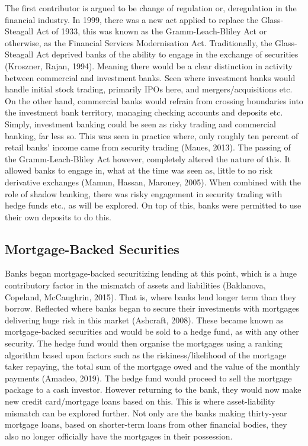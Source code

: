 \documentclass[11pt, english]{article}
\begin{document}
	The first contributor is argued to be change of regulation or, deregulation in the financial industry. In 1999, there was a new act applied to replace the Glass-Steagall Act of 1933, this was known as the Gramm-Leach-Bliley Act or otherwise, as the Financial Services Modernisation Act. Traditionally, the Glass-Steagall Act deprived banks of the ability to engage in the exchange of securities (Kroszner, Rajan, 1994). Meaning there would be a clear distinction in activity between commercial and investment banks. Seen where investment banks would handle initial stock trading, primarily IPOs here, and mergers/acquisitions etc. On the other hand, commercial banks would refrain from crossing boundaries into the investment bank territory, managing checking accounts and deposits etc. Simply, investment banking could be seen as risky trading and commercial banking, far less so. This was seen in practice where, only roughly ten percent of retail banks' income came from security trading (Maues, 2013). The passing of the Gramm-Leach-Bliley Act however, completely altered the nature of this. It allowed banks to engage in, what at the time was seen as, little to no risk derivative exchanges (Mamun, Hassan, Maroney, 2005). When combined with the role of shadow banking, there was risky engagement in security trading with hedge funds etc., as will be explored. On top of this, banks were permitted to use their own deposits to do this. 

	\subsection{Mortgage-Backed Securities}

	Banks began mortgage-backed securitizing lending at this point, which is a huge contributory factor in the mismatch of assets and liabilities (Baklanova, Copeland, McCaughrin, 2015). That is, where banks lend longer term than they borrow. Reflected where banks began to secure their investments with mortgages delivering huge risk in this market (Ashcraft, 2008). These became known as mortgage-backed securities and would be sold to a hedge fund, as with any other security. The hedge fund would then organise the mortgages using a ranking algorithm based upon factors such as the riskiness/likelihood of the mortgage taker repaying, the total sum of the mortgage owed and the value of the monthly payments (Amadeo, 2019). The hedge fund would proceed to sell the mortgage package to a cash investor. However returning to the bank, they would now make new credit card/mortgage loans based on this. This is where asset-liability mismatch can be explored further. Not only are the banks making thirty-year mortgage loans, based on shorter-term loans from other financial bodies, they also no longer officially have the mortgages in their possession.
\end{document}
